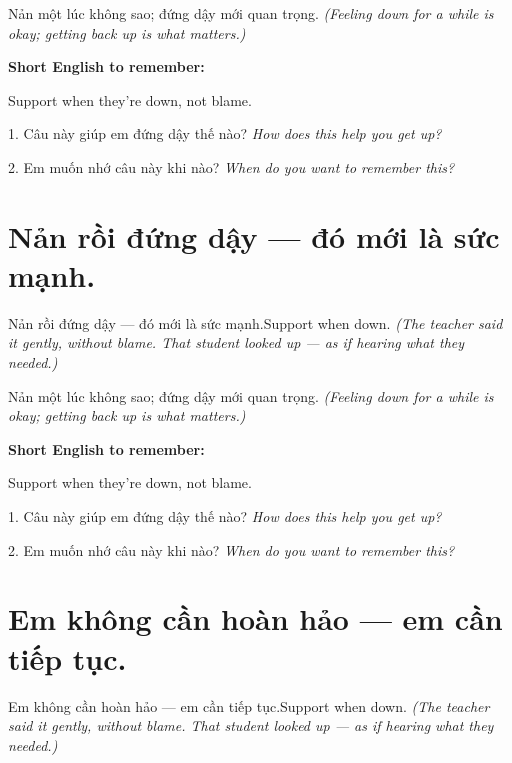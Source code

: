 \begin{baihoc}
Nản một lúc không sao; đứng dậy mới quan trọng.
\textit{(Feeling down for a while is okay; getting back up is what matters.)}
\end{baihoc}

\begin{ghinhoanh}
\textbf{Short English to remember:}

Support when they're down, not blame.

\end{ghinhoanh}

\begin{tuhocnhanh}
1. Câu này giúp em đứng dậy thế nào? \textit{How does this help you get up?}

2. Em muốn nhớ câu này khi nào? \textit{When do you want to remember this?}
\end{tuhocnhanh}
\ngancach


\section{Nản rồi đứng dậy — đó mới là sức mạnh.}
\begin{truyen}{Nản rồi đứng dậy — đó mới là sức mạnh.}{Support when down.}
\textit{(The teacher said it gently, without blame. That student looked up — as if hearing what they needed.)}
\end{truyen}

\begin{baihoc}
Nản một lúc không sao; đứng dậy mới quan trọng.
\textit{(Feeling down for a while is okay; getting back up is what matters.)}
\end{baihoc}

\begin{ghinhoanh}
\textbf{Short English to remember:}

Support when they're down, not blame.

\end{ghinhoanh}

\begin{tuhocnhanh}
1. Câu này giúp em đứng dậy thế nào? \textit{How does this help you get up?}

2. Em muốn nhớ câu này khi nào? \textit{When do you want to remember this?}
\end{tuhocnhanh}
\ngancach


\section{Em không cần hoàn hảo — em cần tiếp tục.}
\begin{truyen}{Em không cần hoàn hảo — em cần tiếp tục.}{Support when down.}
\textit{(The teacher said it gently, without blame. That student looked up — as if hearing what they needed.)}
\end{truyen}

